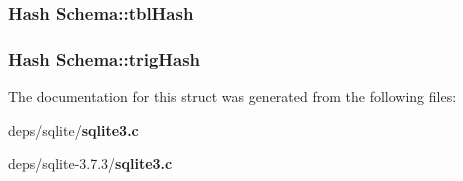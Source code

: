 \subsubsection{\setlength{\rightskip}{0pt plus 5cm}\bf{Hash} \bf{Schema::tbl\-Hash}}\label{structSchema_7d9f5d698b7b0ae85cbc7292c668060b}


\subsubsection{\setlength{\rightskip}{0pt plus 5cm}\bf{Hash} \bf{Schema::trig\-Hash}}\label{structSchema_15d7318cd8c6b805bbf67217ede56e90}




The documentation for this struct was generated from the following files:\begin{CompactItemize}
\item 
deps/sqlite/\bf{sqlite3.c}\item 
deps/sqlite-3.7.3/\bf{sqlite3.c}\end{CompactItemize}
